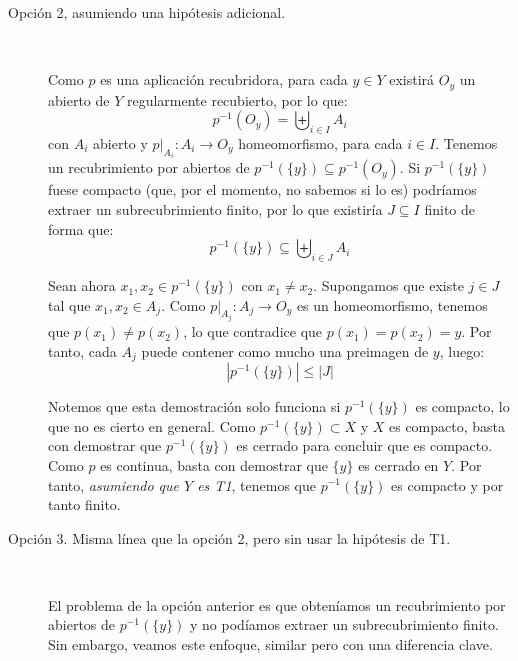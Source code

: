 \documentclass[12pt]{article}
\begin{document}
\begin{ejercicio}
\begin{enumerate}[label=\alph*)]
\begin{description}
                    \item [Opción 2, asumiendo una hipótesis adicional.]~
                    
                    Como $p$ es una aplicación recubridora, para cada $y\in Y$ existirá $O_y$ un abierto de $Y$ regularmente recubierto, por lo que:
                    \begin{equation*}
                        p^{-1}(O_y) = \biguplus_{i \in I} A_i
                    \end{equation*}
                    con $A_i$ abierto y $p\big|_{A_i}:A_i\to O_y$ homeomorfismo, para cada $i \in I$. Tenemos un recubrimiento por abiertos de $p^{-1}(\{y\})\subseteq p^{-1}(O_y)$. Si $p^{-1}(\{y\})$ fuese compacto (que, por el momento, no sabemos si lo es) podríamos extraer un subrecubrimiento finito, por lo que existiría $J\subseteq I$ finito de forma que:
                    \begin{equation*}
                        p^{-1}(\{y\}) \subseteq \biguplus_{i \in J}A_i
                    \end{equation*}

                    Sean ahora $x_1,x_2\in p^{-1}(\{y\})$ con $x_1\neq x_2$. Supongamos que existe $j\in J$ tal que $x_1,x_2\in A_j$. Como $p\big|_{A_j}:A_j\to O_y$ es un homeomorfismo, tenemos que $p(x_1)\neq p(x_2)$, lo que contradice que $p(x_1)=p(x_2)=y$. Por tanto, cada $A_j$ puede contener como mucho una preimagen de $y$, luego:
                    \begin{equation*}
                        |p^{-1}(\{y\})| \leq |J|
                    \end{equation*}

                    Notemos que esta demostración solo funciona si $p^{-1}(\{y\})$ es compacto, lo que no es cierto en general. Como $p^{-1}(\{y\})\subset X$ y $X$ es compacto, basta con demostrar que $p^{-1}(\{y\})$ es cerrado para concluir que es compacto. Como $p$ es continua, basta con demostrar que $\{y\}$ es cerrado en $Y$. Por tanto, \emph{asumiendo que $Y$ es T1}, tenemos que $p^{-1}(\{y\})$ es compacto y por tanto finito.

                    \item[Opción 3. Misma línea que la opción 2, pero sin usar la hipótesis de T1.]~
                    
                    El problema de la opción anterior es que obteníamos un recubrimiento por abiertos de $p^{-1}(\{y\})$ y no podíamos extraer un subrecubrimiento finito. Sin embargo, veamos este enfoque, similar pero con una diferencia clave.


\end{description}
\end{enumerate}
\end{ejercicio}
\end{document}
